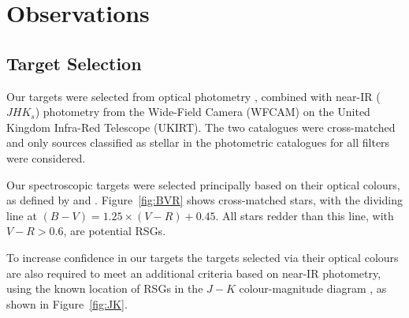 \documentclass[iop]{emulateapj}
\begin{document}

\section{Observations}


\label{sec:observations}

\subsection{Target Selection} %
\label{sub:target_selection}

Our targets were selected from optical photometry
\citep{Massey07}, combined with near-IR ($JHK{_s}$) photometry
\cite[for details see][]{2012A&A...540A.135S} from the Wide-Field Camera (WFCAM) on the United Kingdom Infra-Red Telescope (UKIRT).
The two catalogues were cross-matched and only sources classified as stellar in the photometric catalogues for all filters were considered.

Our spectroscopic targets were selected principally based on their optical colours, as defined by
\cite{Massey98} and
\cite{Levesque12}.
Figure~\ref{fig:BVR} shows cross-matched stars, with the dividing line at $(B - V) = 1.25 \times (V - R)+0.45$.
All stars redder than this line, with $V - R > 0.6$, are potential RSGs.

To increase confidence in our targets the targets selected via their optical colours are also required to meet an additional criteria based on near-IR photometry, using the known location of RSGs in the $J-K$ colour-magnitude diagram
\citep{Nikolaev00}, as shown in Figure~\ref{fig:JK}.
\end{document}
